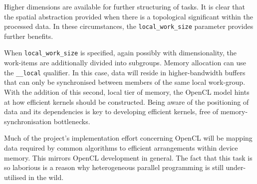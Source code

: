 Higher dimensions are available for further structuring of tasks. It is clear that the spatial abstraction provided when there is a topological significant within the processed data. In these circumstances, the \verb|local_work_size| parameter provides further benefits.

When \verb|local_work_size| is specified, again possibly with dimensionality, the work-items are additionally divided into subgroups. Memory allocation can use the \verb|__local| qualifier. In this case, data will reside in higher-bandwidth buffers that can only be synchronised between members of the same local work-group. With the addition of this second, local tier of memory, the \ac{OpenCL} model hints at how efficient kernels should be constructed. Being aware of the positioning of data and its dependencies is key to developing efficient kernels, free of memory-synchronisation bottlenecks.

Much of the project's implementation effort concerning \ac{OpenCL} will be mapping data required by common algorithms to efficient arrangements within device memory. This mirrors \ac{OpenCL} development in general.
The fact that this task is so laborious is a reason why heterogeneous parallel programming is still under-utilised in the wild.


